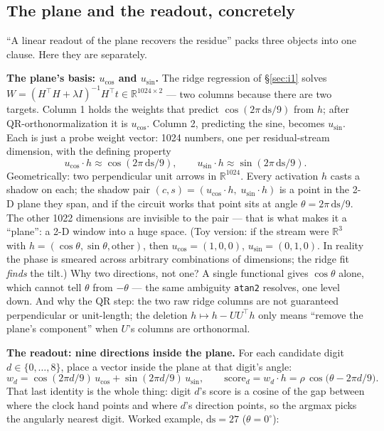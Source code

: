 \documentclass[11pt]{article}
\newcommand{\ds}{\mathrm{ds}}
\begin{document}
\subsection{The plane and the readout, concretely}
\label{sec:planereadout}

``A linear readout of the plane recovers the residue'' packs three objects into
one clause. Here they are separately.

\textbf{The plane's basis: $u_{\cos}$ and $u_{\sin}$.} The ridge regression of
\S\ref{sec:i1} solves $W = (H^\top H + \lambda I)^{-1} H^\top t \in
\mathbb{R}^{1024 \times 2}$ --- two columns because there are two targets.
Column 1 holds the weights that predict $\cos(2\pi\,\ds/9)$ from $h$; after
QR-orthonormalization it is $u_{\cos}$. Column 2, predicting the sine, becomes
$u_{\sin}$. Each is just a probe weight vector: 1024 numbers, one per
residual-stream dimension, with the defining property
\[
u_{\cos} \cdot h \approx \cos(2\pi\,\ds/9), \qquad
u_{\sin} \cdot h \approx \sin(2\pi\,\ds/9).
\]
Geometrically: two perpendicular unit arrows in $\mathbb{R}^{1024}$. Every
activation $h$ casts a shadow on each; the shadow pair
$(c, s) = (u_{\cos}\!\cdot h,\; u_{\sin}\!\cdot h)$ is a point in the 2-D plane
they span, and if the circuit works that point sits at angle
$\theta = 2\pi\,\ds/9$. The other 1022 dimensions are invisible to the pair ---
that is what makes it a ``plane'': a 2-D window into a huge space. (Toy version:
if the stream were $\mathbb{R}^3$ with $h = (\cos\theta, \sin\theta,
\text{other})$, then $u_{\cos} = (1,0,0)$, $u_{\sin} = (0,1,0)$. In reality the
phase is smeared across arbitrary combinations of dimensions; the ridge fit
\emph{finds} the tilt.) Why two directions, not one? A single functional gives
$\cos\theta$ alone, which cannot tell $\theta$ from $-\theta$ --- the same
ambiguity \texttt{atan2} resolves, one level down. And why the QR step: the two
raw ridge columns are not guaranteed perpendicular or unit-length; the deletion
$h \mapsto h - UU^\top h$ only means ``remove the plane's component'' when $U$'s
columns are orthonormal.

\textbf{The readout: nine directions inside the plane.} For each candidate digit
$d \in \{0,\dots,8\}$, place a vector inside the plane at that digit's angle:
\[
w_d = \cos(2\pi d/9)\, u_{\cos} + \sin(2\pi d/9)\, u_{\sin},
\qquad
\text{score}_d = w_d \cdot h = \rho\,\cos\!\big(\theta - 2\pi d/9\big).
\]
That last identity is the whole thing: digit $d$'s score is a cosine of the gap
between where the clock hand points and where $d$'s direction points, so the
argmax picks the angularly nearest digit. Worked example, $\ds = 27$
($\theta = 0^\circ$):
\end{document}
